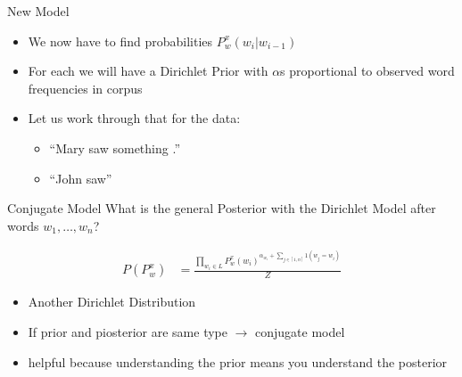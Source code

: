 \documentclass[11pt]{beamer}
\begin{document}
	\begin{frame}{New Model}
		\begin{itemize}
			\item<1-> We now have to find probabilities $P_{w}^{x}(w_i|w_{i-1})$
			\item<1-> For each we will have a Dirichlet Prior with $\alpha$s proportional to observed word frequencies in corpus
			\item<2-> Let us work through that for the data:
				\begin{itemize}
					\item<2-> ``Mary saw something .''
					\item<2-> ``John saw'' 
				\end{itemize}
		\end{itemize}
	\end{frame}
	
	\begin{frame}{Conjugate Model}
		What is the general Posterior with the Dirichlet Model after words $w_1,\dots,w_n$?
		
		\begin{align}
			P(P_{w}^{x}) & = \frac{\prod_{w_i \in L} P_{w}^{x}(w_i)^{\alpha_{w_i}+\sum_{j \in [1,n]} 1(w_j = w_i)}}{Z}
		\end{align}			
		
		\begin{itemize}
			\item Another Dirichlet Distribution
			\item If prior and piosterior are same type $\rightarrow$ conjugate model
			\item helpful because understanding the prior means you understand the posterior
		\end{itemize}
	\end{frame}
	
\end{document}
